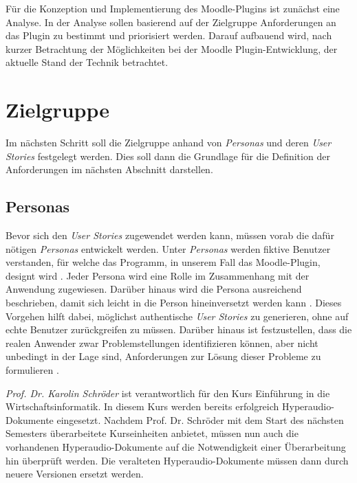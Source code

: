 \label{cha:analyse}
Für die Konzeption und Implementierung des Moodle-Plugins ist zunächst eine Analyse. In der Analyse sollen basierend auf der Zielgruppe Anforderungen an das Plugin zu bestimmt und priorisiert werden. Darauf aufbauend wird, nach kurzer Betrachtung der Möglichkeiten bei der Moodle Plugin-Entwicklung, der aktuelle Stand der Technik betrachtet.



\section{Zielgruppe}
Im nächsten Schritt soll die Zielgruppe anhand von \textit{Personas} und deren \textit{User Stories} festgelegt werden. Dies soll dann die Grundlage für die Definition der Anforderungen im nächsten Abschnitt darstellen.


\subsection{Personas}
\label{sec:personas}
Bevor sich den \textit{User Stories} zugewendet werden kann, müssen vorab die dafür nötigen \textit{Personas} entwickelt werden. Unter \textit{Personas} werden fiktive Benutzer verstanden, für welche das Programm, in unserem Fall das Moodle-Plugin, designt wird \citep{cooper2004inmates}. Jeder Persona wird eine Rolle im Zusammenhang mit der Anwendung zugewiesen. Darüber hinaus wird die Persona ausreichend beschrieben, damit sich leicht in die Person hineinversetzt werden kann \citep{cohn2004user}. Dieses Vorgehen hilft dabei, möglichst authentische \textit{User Stories} zu generieren, ohne auf echte Benutzer zurückgreifen zu müssen. Darüber hinaus ist festzustellen, dass die realen Anwender zwar Problemstellungen identifizieren können, aber nicht unbedingt in der Lage sind, Anforderungen zur Lösung dieser Probleme zu formulieren \citep{cooper2004inmates}.

\par
\begingroup
\leftskip=1cm
\rightskip=1.5cm
\noindent

{\Large\emph{Prof. Dr. Karolin Schröder}} ist verantwortlich für den Kurs \glqq Einführung in die Wirtschaftsinformatik\grqq{}. In diesem Kurs werden bereits erfolgreich Hyperaudio-Dokumente eingesetzt. Nachdem Prof. Dr. Schröder mit dem Start des nächsten Semesters überarbeitete Kurseinheiten anbietet, müssen nun auch die vorhandenen Hyperaudio-Dokumente auf die Notwendigkeit einer Überarbeitung hin überprüft werden. Die veralteten Hyperaudio-Dokumente müssen dann durch neuere Versionen ersetzt werden.
\vspace{.5cm}


